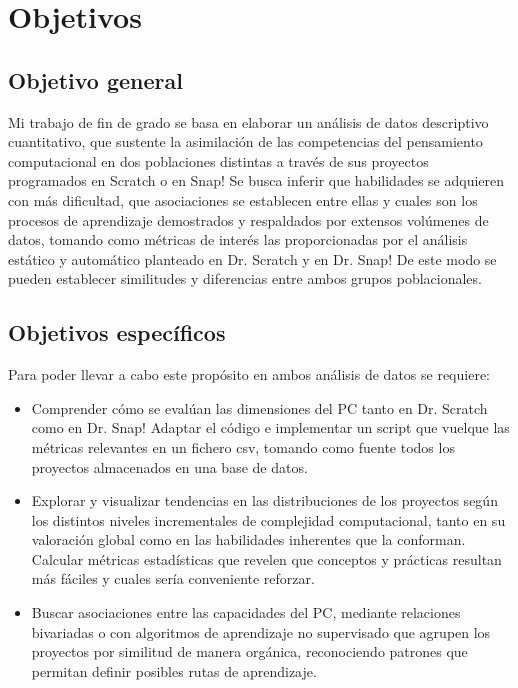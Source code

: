 \documentclass[a4paper, 12pt]{book}
\begin{document}

\cleardoublepage %
\chapter{Objetivos} 
\label{chap:objetivos} 

\section{Objetivo general} 
\label{sec:objetivo-general} 

Mi trabajo de fin de grado se basa en elaborar un análisis de datos descriptivo cuantitativo, que sustente la asimilación de las competencias del pensamiento computacional en dos poblaciones distintas a través de sus proyectos programados en Scratch o en Snap! Se busca inferir que habilidades se adquieren con más dificultad, que asociaciones se establecen entre ellas y cuales son los procesos de aprendizaje demostrados y respaldados por extensos volúmenes de datos, tomando como métricas de interés las proporcionadas por el análisis estático y automático planteado en Dr. Scratch y en Dr. Snap! De este modo se pueden establecer similitudes y diferencias entre ambos grupos poblacionales.

\section{Objetivos específicos}
\label{sec:objetivos-especificos}

Para poder llevar a cabo este propósito en ambos análisis de datos se requiere:

\begin{itemize}
    \item Comprender cómo se evalúan las dimensiones del PC tanto en Dr. Scratch como en Dr. Snap! Adaptar el código e implementar un script que vuelque las métricas relevantes en un fichero csv, tomando como fuente todos los proyectos almacenados en una base de datos.
    \item Explorar y visualizar tendencias en las distribuciones de los proyectos según los distintos niveles incrementales de complejidad computacional, tanto en su valoración global como en las habilidades inherentes que la conforman. Calcular métricas estadísticas que revelen que conceptos y prácticas resultan más fáciles y cuales sería conveniente reforzar. 
    \item Buscar asociaciones entre las capacidades del PC, mediante relaciones bivariadas o con algoritmos de aprendizaje no supervisado que agrupen los proyectos por similitud de manera orgánica, reconociendo patrones que permitan definir posibles rutas de aprendizaje.
   
\end{itemize}
\end{document}

